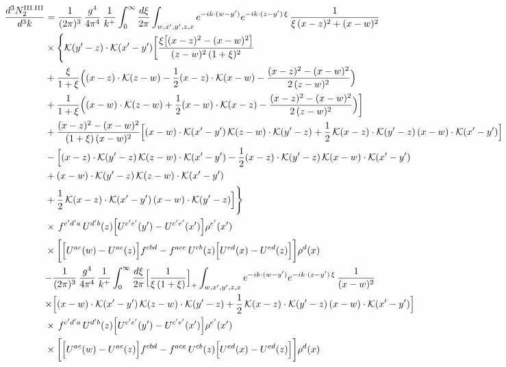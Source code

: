\documentclass[9pt]{article}
\numberwithin{equation}{section}
\begin{document}
\begin{align}
\frac{d^{3}N^{\rm III.III}_{2}}{d^{3}k} & =\frac{1}{(2\pi)^{3}}\,\frac{g^{4}}{4\pi^{4}}\,\frac{1}{k^{+}}\int_{0}^{\infty}\frac{d\xi}{2\pi}\int_{w,x',y',z,x}e^{-ik\cdot(w-y')}e^{-ik\cdot(z-y')\,\xi}\,\frac{1}{\xi\,(x-z)^{2}+(x-w)^{2}}\notag\\
&\times\Bigg\{\mathcal{K}(y'-z)\cdot\mathcal{K}(x'-y')\bigg[\frac{\xi\big[(x-z)^{2}-(x-w)^{2}\big]}{(z-w)^{2}\,(1+\xi)^{2}}\notag\\
&+\frac{\xi}{1+\xi}\Big((x-z)\cdot\mathcal{K}(z-w)-\frac{1}{2}(x-z)\cdot\mathcal{K}(x-w)-\frac{(x-z)^{2}-(x-w)^{2}}{2\,(z-w)^{2}}\Big)\notag\\
&+\frac{1}{1+\xi}\Big((x-w)\cdot\mathcal{K}(z-w)+\frac{1}{2}(x-w)\cdot\mathcal{K}(x-z)-\frac{(x-z)^{2}-(x-w)^{2}}{2\,(z-w)^{2}}\Big)\bigg]\notag\\
&+\frac{(x-z)^{2}-(x-w)^{2}}{(1+\xi)\,(x-w)^{2}}\Big[(x-w)\cdot\mathcal{K}(x'-y')\,\mathcal{K}(z-w)\cdot\mathcal{K}(y'-z)+\frac{1}{2}\,\mathcal{K}(x-z)\cdot\mathcal{K}(y'-z)\,(x-w)\cdot\mathcal{K}(x'-y')\Big]\notag\\
&-\Big[(x-z)\cdot\mathcal{K}(y'-z)\,\mathcal{K}(z-w)\cdot\mathcal{K}(x'-y')-\frac{1}{2}(x-z)\cdot\mathcal{K}(y'-z)\,\mathcal{K}(x-w)\cdot\mathcal{K}(x'-y')\notag\\
&+(x-w)\cdot\mathcal{K}(y'-z)\,\mathcal{K}(z-w)\cdot\mathcal{K}(x'-y')\notag\\
&+\frac{1}{2}\,\mathcal{K}(x-z)\cdot\mathcal{K}(x'-y')\,(x-w)\cdot\mathcal{K}(y'-z)\Big]\Bigg\}\notag\\
&\times\,f^{c'd'a}\,U^{d'b}(z)\Big[U^{c'e'}(y')-U^{c'e'}(x')\Big]\rho^{e'}(x')\notag\\
&\times\bigg[\Big[U^{ac}(w)-U^{ac}(z)\Big]f^{cbd}-f^{ace}\,U^{cb}(z)\Big[U^{ed}(x)-U^{ed}(z)\Big]\bigg]\rho^{d}(x)\notag\\
&{-\frac{1}{(2\pi)^{3}}\,\frac{g^{4}}{4\pi^{4}}\,\frac{1}{k^{+}}\int_{0}^{\infty}\frac{d\xi}{2\pi}\Big[\frac{1}{\xi\,(1+\xi)}\Big]_{+}\int_{w,x',y',z,x}e^{-ik\cdot(w-y')}e^{-ik\cdot(z-y')\,\xi}\,\frac{1}{(x-w)^{2}}}\notag\\
&{\times\Big[(x-w)\cdot\mathcal{K}(x'-y')\,\mathcal{K}(z-w)\cdot\mathcal{K}(y'-z)+\frac{1}{2}\,\mathcal{K}(x-z)\cdot\mathcal{K}(y'-z)\,(x-w)\cdot\mathcal{K}(x'-y')\Big]}\notag\\
&\times\,f^{c'd'a}\,U^{d'b}(z)\Big[U^{c'e'}(y')-U^{c'e'}(x')\Big]\rho^{e'}(x')\notag\\
&\times\bigg[\Big[U^{ac}(w)-U^{ac}(z)\Big]f^{cbd}-f^{ace}\,U^{cb}(z)\Big[U^{ed}(x)-U^{ed}(z)\Big]\bigg]\rho^{d}(x)\notag\\

\end{align}
\end{document}
